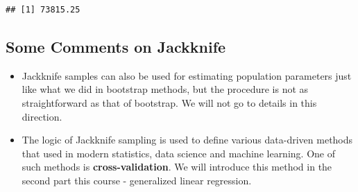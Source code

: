 \documentclass[
]{book}
\newenvironment{Shaded}{\begin{snugshade}}{\end{snugshade}}
\newcommand{\AttributeTok}[1]{\textcolor[rgb]{0.13,0.29,0.53}{#1}}
\newcommand{\ConstantTok}[1]{\textcolor[rgb]{0.56,0.35,0.01}{#1}}
\newcommand{\ControlFlowTok}[1]{\textcolor[rgb]{0.13,0.29,0.53}{\textbf{#1}}}
\newcommand{\DecValTok}[1]{\textcolor[rgb]{0.00,0.00,0.81}{#1}}
\newcommand{\FunctionTok}[1]{\textcolor[rgb]{0.13,0.29,0.53}{\textbf{#1}}}
\newcommand{\NormalTok}[1]{#1}
\newcommand{\OtherTok}[1]{\textcolor[rgb]{0.56,0.35,0.01}{#1}}
\newcommand{\SpecialCharTok}[1]{\textcolor[rgb]{0.81,0.36,0.00}{\textbf{#1}}}
\newcommand{\StringTok}[1]{\textcolor[rgb]{0.31,0.60,0.02}{#1}}
\begin{document}
\begin{Shaded}
\end{Shaded}

\begin{verbatim}
## [1] 73815.25
\end{verbatim}

\hypertarget{some-comments-on-jackknife}{%
\subsection{Some Comments on Jackknife}\label{some-comments-on-jackknife}}

\begin{itemize}
\item
  Jackknife samples can also be used for estimating population parameters just like what we did in bootstrap methods, but the procedure is not as straightforward as that of bootstrap. We will not go to details in this direction.
\item
  The logic of Jackknife sampling is used to define various data-driven methods that used in modern statistics, data science and machine learning. One of such methods is \textbf{cross-validation}. We will introduce this method in the second part this course - generalized linear regression.
\end{itemize}
\end{document}
